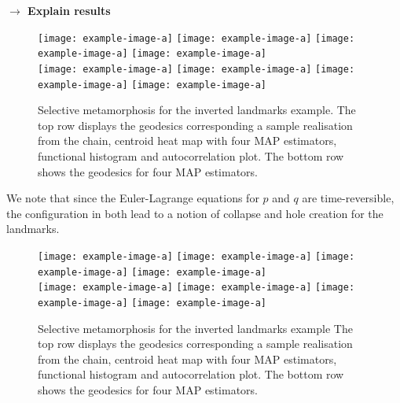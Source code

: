 \documentclass[runningheads]{llncs}
\begin{document}
\textbf{$\longrightarrow$ Explain results}\\

\begin{figure}
\centering
\begin{minipage}{\textwidth}
  \centering
    \texttt{[image: example-image-a]}\quad
    \texttt{[image: example-image-a]}\quad
    \texttt{[image: example-image-a]}\quad
    \texttt{[image: example-image-a]}\\[0.25cm]
    \texttt{[image: example-image-a]}\quad
    \texttt{[image: example-image-a]}\quad
    \texttt{[image: example-image-a]}\quad
    \texttt{[image: example-image-a]}
    \caption{Selective metamorphosis for the inverted landmarks example. The top
    row displays the geodesics corresponding a sample realisation from the
    chain, centroid heat map with four MAP estimators, functional histogram and
    autocorrelation plot. The bottom row shows the geodesics for four MAP
    estimators.}
    \label{fig:selective:crossing}
\end{minipage}
\end{figure}

We note that since the Euler-Lagrange equations for $p$ and $q$ are
time-reversible, the configuration in both lead to a notion of
collapse and hole creation for the landmarks.\\

\begin{figure}
\centering
\begin{minipage}{\textwidth}
  \centering
    \texttt{[image: example-image-a]}\quad
    \texttt{[image: example-image-a]}\quad
    \texttt{[image: example-image-a]}\quad
    \texttt{[image: example-image-a]}\\[0.25cm]
    \texttt{[image: example-image-a]}\quad
    \texttt{[image: example-image-a]}\quad
    \texttt{[image: example-image-a]}\quad
    \texttt{[image: example-image-a]}
    \caption{Selective metamorphosis for the inverted landmarks example The top
    row displays the geodesics corresponding a sample realisation from the
    chain, centroid heat map with four MAP estimators, functional histogram and
    autocorrelation plot. The bottom row shows the geodesics for four MAP
    estimators.}
    \label{fig:selective:squeeze}
\end{minipage}
\end{figure}
\end{document}
